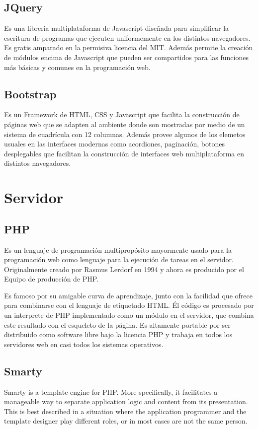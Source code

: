 \subsection{JQuery}
Es una libreria multiplataforma de Javascript diseñada para simplificar la escritura de programas que ejecuten uniformemente en los distintos navegadores. Es gratis amparado en la permisiva licencia del MIT. Además permite la creación de módulos encima de Javascript que pueden ser compartidos para las funciones más básicas y comunes en la programación web.


\subsection{Bootstrap}
Es un Framework de HTML, CSS y Javascript que facilita la construcción de páginas web que se adapten al ambiente donde son mostradas por medio de un sistema de cuadrícula con 12 columnas. Además provee algunos de los elemetos usuales en las interfaces modernas como acordiones, paginación, botones desplegables que facilitan la construcción de interfaces web multiplataforma en distintos navegadores.


\section{Servidor}

\subsection{PHP}

Es un lenguaje de programación multipropósito mayormente usado para la programación web como lenguaje para la ejecución de tareas en el servidor. Originalmente creado por Rasmus Lerdorf en 1994 y ahora es producido por el Equipo de producción de PHP. 

Es famoso por su amigable curva de aprendizaje, junto con la facilidad que ofrece para combinarse con el lenguaje de etiquetado HTML. Él código es procesado por un interprete de PHP implementado como un módulo en el servidor, que combina este resultado con el esqueleto de la página. Es altamente portable por ser distribuido como software libre bajo la licencia PHP y trabaja en todos los servidores web en casi todos los sistemas operativos.

\subsection{Smarty}
Smarty is a template engine for PHP. More specifically, it facilitates a manageable way to separate application logic and content from its presentation. This is best described in a situation where the application programmer and the template designer play different roles, or in most cases are not the same person.

